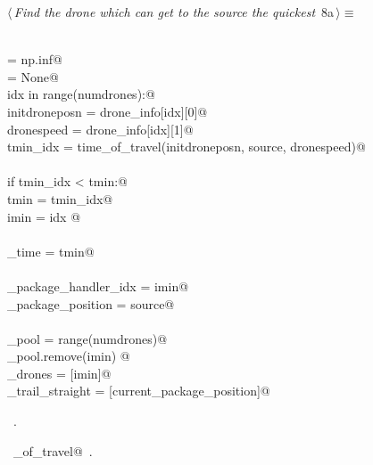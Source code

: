 \documentclass[10pt, english, oneside]{report}
\begin{document}
\begin{flushleft} \small
\begin{minipage}{\linewidth}\label{scrap4}\raggedright\small
{} $\langle\,${\itshape Find the drone which can get to the source the quickest}\nobreak\ {\footnotesize {8a}}$\,\rangle\equiv$
\vspace{-1ex}
\begin{list}{}{} \item
\mbox{}\verb@@\\
\mbox{}\verb@tmin = np.inf@\\
\mbox{}\verb@imin = None@\\
\mbox{}\verb@for idx in range(numdrones):@\\
\mbox{}\verb@         initdroneposn = drone_info[idx][0]@\\
\mbox{}\verb@         dronespeed    = drone_info[idx][1]@\\
\mbox{}\verb@         tmin_idx = time_of_travel(initdroneposn, source, dronespeed)@\\
\mbox{}\verb@@\\
\mbox{}\verb@         if tmin_idx < tmin:@\\
\mbox{}\verb@             tmin = tmin_idx@\\
\mbox{}\verb@             imin = idx @\\
\mbox{}\verb@@\\
\mbox{}\verb@clock_time = tmin@\\
\mbox{}\verb@@\\
\mbox{}\verb@current_package_handler_idx = imin@\\
\mbox{}\verb@current_package_position    = source@\\
\mbox{}\verb@@\\
\mbox{}\verb@drone_pool = range(numdrones)@\\
\mbox{}\verb@drone_pool.remove(imin) @\\
\mbox{}\verb@used_drones = [imin]@\\
\mbox{}\verb@package_trail_straight = [current_package_position]@\\
\mbox{}\verb@@{\NWsep}
\end{list}
\vspace{-1.5ex}
\footnotesize
\begin{list}{}{\setlength{\itemsep}{-\parsep}\setlength{\itemindent}{-\leftmargin}}
\item \NWtxtMacroRefIn\ .
\item \NWtxtIdentsUsed\nobreak\  \verb@time_of_travel@\nobreak\ .
\item{}
\end{list}
\end{minipage}\vspace{4ex}
\end{flushleft}
\end{document}
